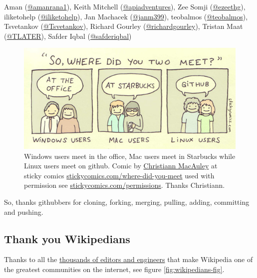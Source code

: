\documentclass[
]{book}
\begin{document}
Aman (\href{https://github.com/amanrana1}{@amanrana1}), Keith Mitchell (\href{https://github.com/apiadventures}{@apiadventures}), Zee Somji (\href{https://github.com/ezeethg}{@ezeethg}), iliketohelp (\href{https://github.com/iliketohelp}{@iliketohelp}), Jan Machacek (\href{https://github.com/janm399}{@janm399}), teobalmos (\href{https://github.com/teobalmos}{@teobalmos}), Tsvetankov (\href{https://github.com/Tsvetankov}{@Tsvetankov}), Richard Gourley (\href{https://github.com/richardgourley}{@richardgourley}), Tristan Maat (\href{https://github.com/TLATER}{@TLATER}), Safder Iqbal (\href{https://github.com/safderiqbal}{@safderiqbal})

\begin{figure}

{\centering \includegraphics[width=1\linewidth]{images/os_couples} 

}

\caption{Windows users meet in the office, Mac users meet in Starbucks while Linux users meet on github. Comic by \href{https://www.linkedin.com/in/cmacauley}{Christiann MacAuley} at sticky comics \href{https://www.stickycomics.com/where-did-you-meet/}{stickycomics.com/where-did-you-meet} used with permission see \href{https://www.stickycomics.com/permissions/}{stickycomics.com/permissions}. Thanks Christiann.}\label{fig:sticky-comics-fig}
\end{figure}



So, thanks githubbers for cloning, forking, merging, pulling, adding, committing and pushing. 🙏

\hypertarget{wikipedians}{%
\subsection{Thank you Wikipedians}\label{wikipedians}}

Thanks to all the \href{https://en.wikipedia.org/wiki/Wikipedia:Wikipedians}{thousands of editors and engineers} that make Wikipedia one of the greatest communities on the internet, see figure \ref{fig:wikipedians-fig}.
\end{document}
